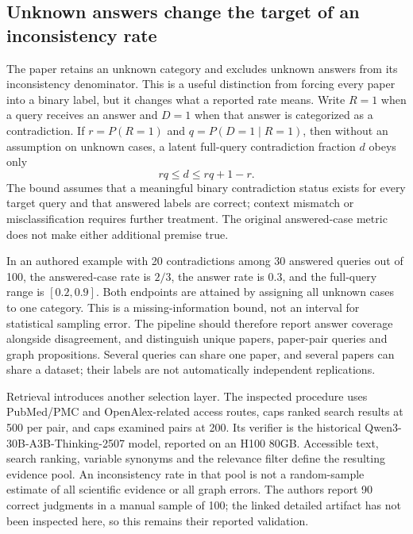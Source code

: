 \subsection{Unknown answers change the target of an inconsistency rate}

The paper retains an unknown category and excludes unknown answers from its
inconsistency denominator. This is a useful distinction from forcing every
paper into a binary label, but it changes what a reported rate means. Write
$R=1$ when a query receives an answer and $D=1$ when that answer is categorized
as a contradiction. If $r=P(R=1)$ and $q=P(D=1\mid R=1)$, then without an
assumption on unknown cases, a latent full-query contradiction fraction $d$
obeys only
\begin{equation}
 rq\leq d\leq rq+1-r.
\label{exec17:validity-unknown}
\end{equation}
The bound assumes that a meaningful binary contradiction status exists for
every target query and that answered labels are correct; context mismatch or
misclassification requires further treatment. The original answered-case
metric does not make either additional premise true.
\citep{exec17_benchmark_consistency}

In an authored example with 20 contradictions among 30 answered queries out
of 100, the answered-case rate is $2/3$, the answer rate is $0.3$, and the
full-query range is $[0.2,0.9]$. Both endpoints are attained by assigning all
unknown cases to one category. This is a missing-information bound, not an
interval for statistical sampling error.\citep{exec17_advice_validity_exact}
The pipeline should therefore report answer coverage alongside disagreement,
and distinguish unique papers, paper-pair queries and graph propositions.
Several queries can share one paper, and several papers can share a dataset;
their labels are not automatically independent replications.

Retrieval introduces another selection layer. The inspected procedure uses
PubMed/PMC and OpenAlex-related access routes, caps ranked search results at
500 per pair, and caps examined pairs at 200. Its verifier is the historical
Qwen3-30B-A3B-Thinking-2507 model, reported on an H100 80GB. Accessible text,
search ranking, variable synonyms and the relevance filter define the resulting
evidence pool. An inconsistency rate in that pool is not a random-sample
estimate of all scientific evidence or all graph errors. The authors report
90 correct judgments in a manual sample of 100; the linked detailed artifact
has not been inspected here, so this remains their reported validation.
\citep{exec17_benchmark_consistency}


